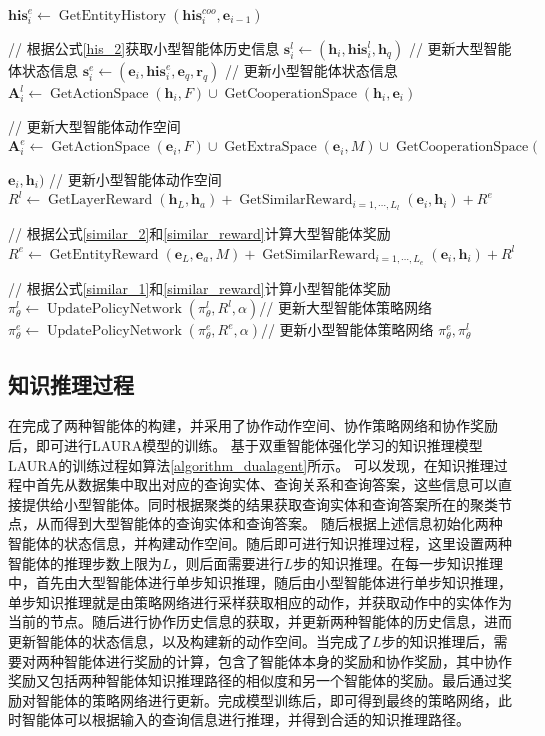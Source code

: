 \documentclass[algorithmlist, AutoFakeBold, AutoFakeSlant, figurelist, tablelist, nomlist, engineering, openany]{seuthesix} %
\begin{document}
\begin{algorithm}[H]
\begin{algorithmic}[1]
  \State $\bm{his}_{i}^{e} \leftarrow \operatorname{GetEntityHistory}(\bm{his}_{i}^{coo}, \bm{e}_{i-1})$ \par\quad\quad // 根据公式\ref{his_2}获取小型智能体历史信息
  \State $\bm{s}_{i}^{l} \leftarrow (\bm{h}_{i}, \bm{his}_{i}^{l}, \bm{h}_q)$ // 更新大型智能体状态信息
  \State $\bm{s}_{i}^{e} \leftarrow (\bm{e}_{i}, \bm{his}_{i}^{e}, \bm{e}_q, \bm{r}_q)$ // 更新小型智能体状态信息
  \State $\bm{A}_{i}^{l} \leftarrow \operatorname{GetActionSpace}(\bm{h}_i, F) \cup \operatorname{GetCooperationSpace}(\bm{h}_i, \bm{e}_i)$ \par\quad\quad// 更新大型智能体动作空间
  \State $\bm{A}_{i}^{e} \leftarrow \operatorname{GetActionSpace}(\bm{e}_i, F) \cup \operatorname{GetExtraSpace}(\bm{e}_i, M) \cup \operatorname{GetCooperationSpace}($\par\quad\quad$\bm{e}_i, \bm{h}_i)$ // 更新小型智能体动作空间
  \EndFor
  \State $R^{l} \leftarrow \operatorname{GetLayerReward}(\bm{h}_L, \bm{h}_a) + \operatorname{GetSimilarReward}_{i=1,\cdots,L_l}(\bm{e}_i, \bm{h}_i) + R^{e}$ \par\quad // 根据公式\ref{similar_2}和\ref{similar_reward}计算大型智能体奖励
  \State $R^{e} \leftarrow \operatorname{GetEntityReward}(\bm{e}_L, \bm{e}_a, M) + \operatorname{GetSimilarReward}_{i=1,\cdots,L_e}(\bm{e}_i, \bm{h}_i) + R^{l}$ \par\quad // 根据公式\ref{similar_1}和\ref{similar_reward}计算小型智能体奖励
  \State $\pi_\theta^l \leftarrow \operatorname{UpdatePolicyNetwork}(\pi_\theta^l, R^{l}, \alpha)$// 更新大型智能体策略网络
  \State $\pi_\theta^e \leftarrow \operatorname{UpdatePolicyNetwork}(\pi_\theta^e, R^{e}, \alpha)$// 更新小型智能体策略网络
  \EndFor
  \State \Return $\pi_\theta^e, \pi_\theta^l$
	\end{algorithmic}
\end{algorithm} 

\subsection{知识推理过程}
在完成了两种智能体的构建，并采用了协作动作空间、协作策略网络和协作奖励后，即可进行LAURA模型的训练。
基于双重智能体强化学习的知识推理模型LAURA的训练过程如算法\ref{algorithm_dualagent}所示。
可以发现，在知识推理过程中首先从数据集中取出对应的查询实体、查询关系和查询答案，这些信息可以直接提供给小型智能体。同时根据聚类的结果获取查询实体和查询答案所在的聚类节点，从而得到大型智能体的查询实体和查询答案。
随后根据上述信息初始化两种智能体的状态信息，并构建动作空间。随后即可进行知识推理过程，这里设置两种智能体的推理步数上限为$L$，则后面需要进行$L$步的知识推理。在每一步知识推理中，首先由大型智能体进行单步知识推理，随后由小型智能体进行单步知识推理，单步知识推理就是由策略网络进行采样获取相应的动作，并获取动作中的实体作为当前的节点。随后进行协作历史信息的获取，并更新两种智能体的历史信息，进而更新智能体的状态信息，以及构建新的动作空间。当完成了$L$步的知识推理后，需要对两种智能体进行奖励的计算，包含了智能体本身的奖励和协作奖励，其中协作奖励又包括两种智能体知识推理路径的相似度和另一个智能体的奖励。最后通过奖励对智能体的策略网络进行更新。完成模型训练后，即可得到最终的策略网络，此时智能体可以根据输入的查询信息进行推理，并得到合适的知识推理路径。
\end{document}
